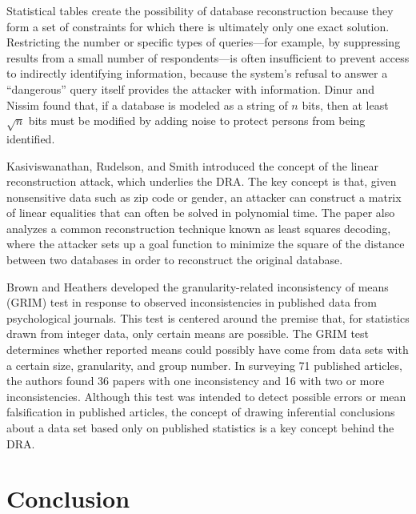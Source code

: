 \documentclass[runningheads]{llncs}
\begin{document}
Statistical tables create the possibility of database reconstruction
because they form a set of constraints for which there is ultimately
only one exact solution. Restricting
the number or specific types of queries---for example, by suppressing
results from a small number of respondents---is often insufficient to prevent access
to indirectly identifying information, because the system's refusal to
answer a ``dangerous'' query itself provides the attacker with information. 
Dinur and Nissim found that, if a database is modeled as a string of $n$ bits,
then at least $\sqrt{n}$ bits must be modified by adding noise to
protect persons from being identified.

Kasiviswanathan, Rudelson, and Smith\cite{Kasiviswanathan:2013:PLR:2627817.2627919} introduced
the concept of the linear reconstruction attack, which underlies the  DRA. The key concept is that,
given nonsensitive data such as zip code or gender, an attacker
can construct a matrix of linear equalities that can often be solved
in polynomial time. The paper also analyzes a common reconstruction
technique known as least squares decoding, where the attacker sets up
a goal function to minimize the square of the distance between two
databases in order to reconstruct the original database.

Brown and Heathers\cite{doi:10.1177/1948550616673876} developed the
granularity-related inconsistency of means (GRIM) test in response to
observed inconsistencies in published data from psychological
journals. This test is centered around the premise that, for
statistics drawn from integer data, only certain means are
possible. The GRIM test determines whether reported means could
possibly have come from data sets with a certain size, granularity,
and group number. In surveying 71 published articles, the authors
found 36 papers with one inconsistency and 16 with two or more
inconsistencies. Although this test was intended to detect possible
errors or mean falsification in published articles, the concept of
drawing inferential conclusions about a data set based only on 
published statistics is a key concept behind the DRA.


\section{Conclusion}
\end{document}
